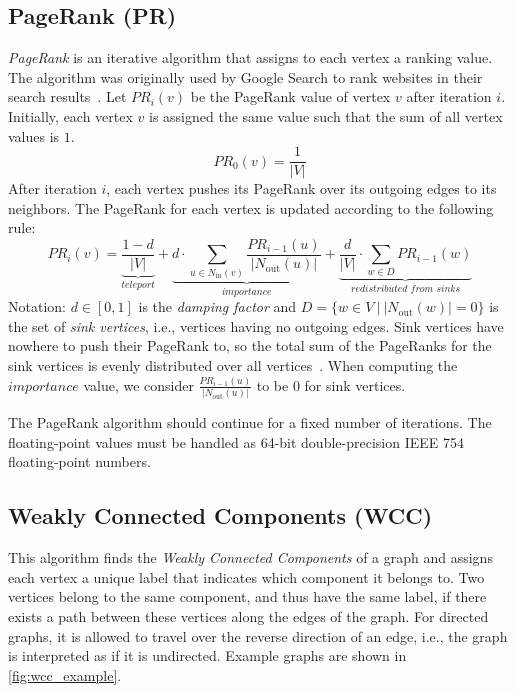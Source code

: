 \subsection{PageRank (PR)}
\label{sec:pr}
\emph{PageRank} is an iterative algorithm that assigns to each vertex a ranking value. The algorithm was originally used by Google Search to rank websites in their search results~\cite{page1999pagerank}. Let $\textit{PR}_i(v)$ be the PageRank value of vertex $v$ after iteration $i$. Initially, each vertex $v$ is assigned the same value such that the sum of all vertex values is $1$.
%
\begin{equation}
\textit{PR}_0(v) = \frac{1}{|V|}
\end{equation}
%
After iteration $i$, each vertex pushes its PageRank over its outgoing edges to its neighbors. The PageRank for each vertex is updated according to the following rule:
%
\begin{equation}
\textit{PR}_i(v) =
  \underbrace{\frac{1-d}{|V|}}_\textit{teleport} +
  \underbrace{d \cdot \sum_{u \in N_\mathrm{in}(v)} \frac{\textit{PR}_{i - 1}(u)}{|N_\mathrm{out}(u)|}}_\textit{importance} +
  \underbrace{\frac{d}{|V|} \cdot \sum_{w \in D} \textit{PR}_{i - 1}(w)}_\textit{redistributed from sinks}
\end{equation}
%
Notation: $d \in [0,1]$ is the \emph{damping factor} and $D = \big\{w \in V \ \big| \ |N_\mathrm{out}(w)| = 0 \big\}$ is the set of \emph{sink vertices}, i.e., vertices having no outgoing edges.
Sink vertices have nowhere to push their PageRank to, so the total sum of the PageRanks for the sink vertices is evenly distributed over all vertices~\cite{DBLP:conf/www/EironMT04}.
When computing the $\textit{importance}$ value, we consider $\frac{\textit{PR}_{i-1}(u)}{|N_\mathrm{out}(u)|}$ to be $0$ for sink vertices. 

The PageRank algorithm should continue for a fixed number of iterations. The floating-point values must be handled as 64-bit double-precision IEEE 754 floating-point numbers. 


\subsection{Weakly Connected Components (WCC)}
\label{sec:wcc}
This algorithm finds the \emph{Weakly Connected Components} of a graph and assigns each vertex a unique label that indicates which component it belongs to. Two vertices belong to the same component, and thus have the same label, if there exists a path between these vertices along the edges of the graph. For directed graphs, it is allowed to travel over the reverse direction of an edge, i.e., the graph is interpreted as if it is undirected.
Example graphs are shown in \autoref{fig:wcc_example}.

